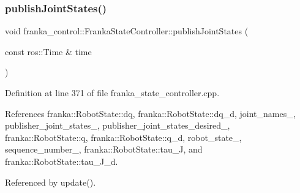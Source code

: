 \mbox{\label{classfranka__control_1_1FrankaStateController_a37c67130a3359cb9cffa6af4a207615e}} 
\subsubsection{\texorpdfstring{publish\+Joint\+States()}{publishJointStates()}}
{\footnotesize\ttfamily void franka\+\_\+control\+::\+Franka\+State\+Controller\+::publish\+Joint\+States (\begin{DoxyParamCaption}\item[{const ros\+::\+Time \&}]{time }\end{DoxyParamCaption})\hspace{0.3cm}{\ttfamily [private]}}



Definition at line 371 of file franka\+\_\+state\+\_\+controller.\+cpp.



References franka\+::\+Robot\+State\+::dq, franka\+::\+Robot\+State\+::dq\+\_\+d, joint\+\_\+names\+\_\+, publisher\+\_\+joint\+\_\+states\+\_\+, publisher\+\_\+joint\+\_\+states\+\_\+desired\+\_\+, franka\+::\+Robot\+State\+::q, franka\+::\+Robot\+State\+::q\+\_\+d, robot\+\_\+state\+\_\+, sequence\+\_\+number\+\_\+, franka\+::\+Robot\+State\+::tau\+\_\+J, and franka\+::\+Robot\+State\+::tau\+\_\+\+J\+\_\+d.



Referenced by update().


